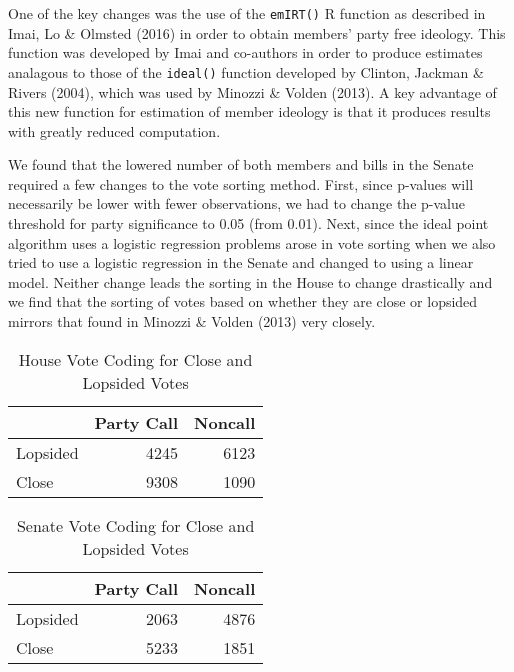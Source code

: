 \documentclass[12pt]{article}
\begin{document}
One of the key changes was the use of the \verb|emIRT()| R function as described in Imai, Lo \& Olmsted (2016) in order to obtain members' party free ideology. This function was developed by Imai and co-authors in order to produce estimates analagous to those of the \verb|ideal()| function developed by Clinton, Jackman \& Rivers (2004), which was used by Minozzi \& Volden (2013). A key advantage of this new function for estimation of member ideology is that it produces results with greatly reduced computation.

We found that the lowered number of both members and bills in the Senate required a few changes to the vote sorting method. First, since p-values will necessarily be lower with fewer observations, we had to change the p-value threshold for party significance to 0.05 (from 0.01). Next, since the ideal point algorithm uses a logistic regression problems arose in vote sorting when we also tried to use a logistic regression in the Senate and changed to using a linear model. Neither change leads the sorting in the House to change drastically and we find that the sorting of votes based on whether they are close or lopsided mirrors that found in Minozzi \& Volden (2013) very closely.

\begin{table}[H]
	\centering
	\caption{House Vote Coding for Close and Lopsided Votes} 
	\begin{tabular}{lrr}
		\hline
		& Party Call & Noncall \\ 
		\hline
		Lopsided & 4245 & 6123 \\ 
		Close & 9308 & 1090 \\ 
		\hline
	\end{tabular}
\end{table}

\begin{table}[H]
	\centering
	\caption{Senate Vote Coding for Close and Lopsided Votes} 
	\begin{tabular}{lrr}
		\hline
		& Party Call & Noncall \\ 
		\hline
		Lopsided & 2063 & 4876 \\ 
		Close & 5233 & 1851 \\ 
		\hline
	\end{tabular}
\end{table}
\end{document}
